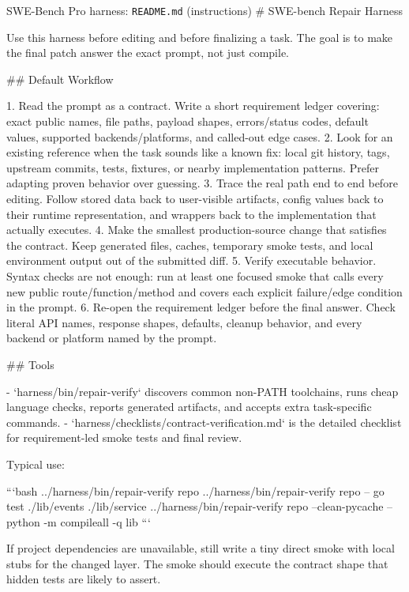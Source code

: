 \begin{promptbox}{SWE-Bench Pro harness: \texttt{README.md} (instructions)}
# SWE-bench Repair Harness

Use this harness before editing and before finalizing a task. The goal is to
make the final patch answer the exact prompt, not just compile.

## Default Workflow

1. Read the prompt as a contract. Write a short requirement ledger covering:
   exact public names, file paths, payload shapes, errors/status codes,
   default values, supported backends/platforms, and called-out edge cases.
2. Look for an existing reference when the task sounds like a known fix:
   local git history, tags, upstream commits, tests, fixtures, or nearby
   implementation patterns. Prefer adapting proven behavior over guessing.
3. Trace the real path end to end before editing. Follow stored data back to
   user-visible artifacts, config values back to their runtime representation,
   and wrappers back to the implementation that actually executes.
4. Make the smallest production-source change that satisfies the contract.
   Keep generated files, caches, temporary smoke tests, and local environment
   output out of the submitted diff.
5. Verify executable behavior. Syntax checks are not enough: run at least one
   focused smoke that calls every new public route/function/method and covers
   each explicit failure/edge condition in the prompt.
6. Re-open the requirement ledger before the final answer. Check literal API
   names, response shapes, defaults, cleanup behavior, and every backend or
   platform named by the prompt.

## Tools

- `harness/bin/repair-verify` discovers common non-PATH toolchains, runs cheap
  language checks, reports generated artifacts, and accepts extra task-specific
  commands.
- `harness/checklists/contract-verification.md` is the detailed checklist for
  requirement-led smoke tests and final review.

Typical use:

```bash
../harness/bin/repair-verify repo
../harness/bin/repair-verify repo -- go test ./lib/events ./lib/service
../harness/bin/repair-verify repo --clean-pycache -- python -m compileall -q lib
```

If project dependencies are unavailable, still write a tiny direct smoke with
local stubs for the changed layer. The smoke should execute the contract shape
that hidden tests are likely to assert.
\end{promptbox}

